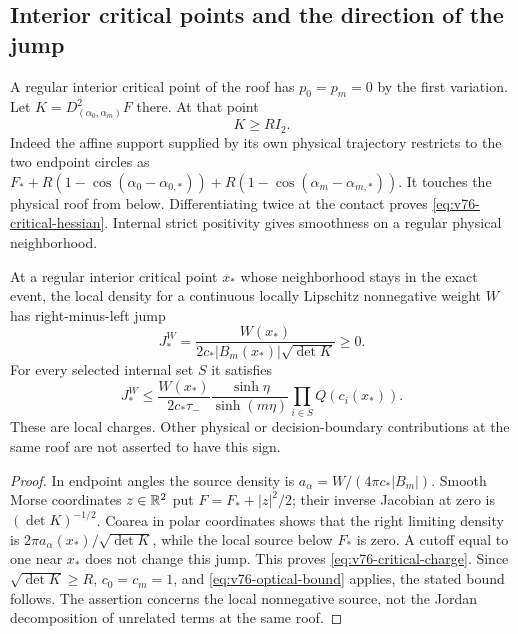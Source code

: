 \subsection{Interior critical points and the direction of the jump}
A regular interior critical point of the roof has $p_0=p_m=0$ by
the first variation. Let $K=D^2_{(\alpha_0,\alpha_m)}F$ there.
At that point
\begin{equation}\label{eq:v76-critical-hessian}
                         K\ge R I_2.
\end{equation}
Indeed the affine support supplied by its own physical trajectory
restricts to the two endpoint circles as
$F_*+R(1-\cos(\alpha_0-\alpha_{0,*}))
     +R(1-\cos(\alpha_m-\alpha_{m,*}))$.
It touches the physical roof from below. Differentiating twice at
the contact proves \eqref{eq:v76-critical-hessian}. Internal strict
positivity gives smoothness on a regular physical neighborhood.

\begin{proposition}
\label{prop:v76-critical-charge}
At a regular interior critical point $x_*$ whose neighborhood stays
in the exact event, the local density for a continuous locally
Lipschitz nonnegative weight $W$ has right-minus-left jump
\begin{equation}\label{eq:v76-critical-charge}
 J_*^W=\frac{W(x_*)}{2c_*|B_m(x_*)|\sqrt{\det K}}\ge0.
\end{equation}
For every selected internal set $S$ it satisfies
\begin{equation}\label{eq:v76-critical-charge-bound}
 J_*^W\le\frac{W(x_*)}{2c_*\tau_-}
              \frac{\sinh\eta}{\sinh(m\eta)}
                        \prod_{i\in S}Q(c_i(x_*)).
\end{equation}
These are local charges. Other physical or decision-boundary
contributions at the same roof are not asserted to have this sign.
\end{proposition}
\begin{proof}
In endpoint angles the source density is
$a_\alpha=W/(4\pi c_*|B_m|)$. Smooth Morse coordinates $z\in\mathbb R^2$
put $F=F_*+|z|^2/2$; their inverse Jacobian at zero is
$(\det K)^{-1/2}$. Coarea in polar coordinates shows that the
right limiting density is $2\pi a_\alpha(x_*)/\sqrt{\det K}$,
while the local source below $F_*$ is zero. A cutoff equal to one
near $x_*$ does not change this jump. This proves
\eqref{eq:v76-critical-charge}. Since $\sqrt{\det K}\ge R$,
$ c_0=c_m=1$, and \eqref{eq:v76-optical-bound} applies, the stated
bound follows. The assertion concerns the local nonnegative source,
not the Jordan decomposition of unrelated terms at the same roof.
\end{proof}

